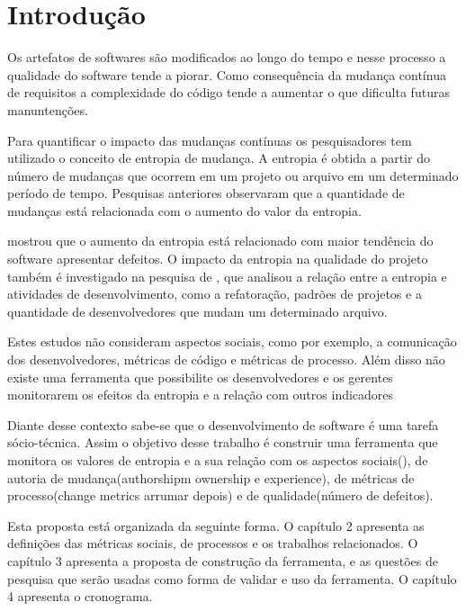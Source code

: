 \chapter{Introdução}

Os artefatos de softwares são modificados ao longo do tempo e nesse processo a qualidade do software tende a piorar. Como consequência da mudança contínua de requisitos a complexidade do código tende a aumentar o que dificulta futuras manuntenções.

Para quantificar o impacto das mudanças contínuas os pesquisadores tem utilizado o conceito de entropia de mudança. A entropia é obtida a partir do número de mudanças que ocorrem em um projeto ou arquivo em um determinado período de tempo. Pesquisas anteriores observaram que a quantidade de mudanças está relacionada com o aumento do valor da entropia.

 mostrou que o aumento da entropia está relacionado com maior tendência do software apresentar defeitos. O impacto da entropia na qualidade do projeto também é investigado na pesquisa de , que analisou a relação entre a entropia e atividades de desenvolvimento, como a refatoração, padrões de projetos e a quantidade de desenvolvedores que mudam um determinado arquivo.

Estes estudos não consideram aspectos sociais, como por exemplo, a comunicação dos desenvolvedores, métricas de código e métricas de processo. Além disso não existe uma ferramenta que possibilite os desenvolvedores e os gerentes monitorarem os efeitos da entropia e a relação com outros indicadores

Diante desse contexto sabe-se que o desenvolvimento de software é uma tarefa sócio-técnica. Assim o objetivo desse trabalho é construir uma ferramenta que monitora os valores de entropia e a sua relação com os aspectos sociais(), de autoria de mudança(authorshipm ownership e experience), de métricas de processo(change metrics arrumar depois) e de qualidade(número de defeitos).

Esta proposta está organizada da seguinte forma. O capítulo 2 apresenta as definições das métricas sociais, de processos e os trabalhos relacionados. O capítulo 3 apresenta a proposta de construção da ferramenta, e as questões de pesquisa que serão usadas como forma de validar e uso da ferramenta. O capítulo 4 apresenta o cronograma.